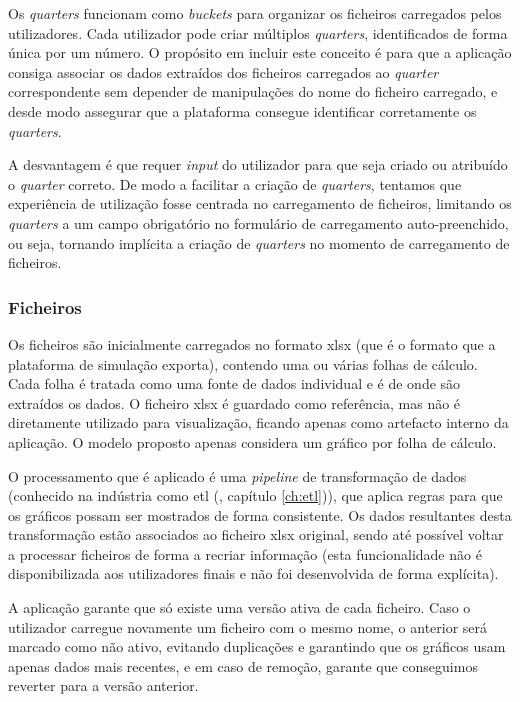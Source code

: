 Os \textit{quarters} funcionam como \textit{buckets} para organizar os ficheiros carregados pelos utilizadores. Cada utilizador pode criar múltiplos \textit{quarters}, identificados de forma única por um número. O propósito em incluir este conceito é para que a aplicação consiga associar os dados extraídos dos ficheiros carregados ao \textit{quarter} correspondente sem depender de manipulações do nome do ficheiro carregado, e desde modo assegurar que a plataforma consegue identificar corretamente os \textit{quarters}. 

A desvantagem é que requer \textit{input} do utilizador para que seja criado ou atribuído o \textit{quarter} correto. De modo a facilitar a criação de \textit{quarters}, tentamos que experiência de utilização fosse centrada no carregamento de ficheiros, limitando os \textit{quarters} a um campo obrigatório no formulário de carregamento auto-preenchido, ou seja, tornando implícita a criação de \textit{quarters} no momento de carregamento de ficheiros.

\subsubsection{Ficheiros}

Os ficheiros são inicialmente carregados no formato \gls{xlsx} (que é o formato que a plataforma de simulação exporta), contendo uma ou várias folhas de cálculo. Cada folha é tratada como uma fonte de dados individual e é de onde são extraídos os dados. O ficheiro \gls{xlsx} é guardado como referência, mas não é diretamente utilizado para visualização, ficando apenas como artefacto interno da aplicação. O modelo proposto apenas considera um gráfico por folha de cálculo.

O processamento que é aplicado é uma \textit{pipeline} de transformação de dados (conhecido na indústria como \gls{etl} (\cf, capítulo \ref{ch:etl})), que aplica regras para que os gráficos possam ser mostrados de forma consistente. Os dados resultantes desta transformação estão associados ao ficheiro \gls{xlsx} original, sendo até possível voltar a processar ficheiros de forma a recriar informação (esta funcionalidade não é disponibilizada aos utilizadores finais e não foi desenvolvida de forma explícita).

A aplicação garante que só existe uma versão ativa de cada ficheiro. Caso o utilizador carregue novamente um ficheiro com o mesmo nome, o anterior será marcado como não ativo, evitando duplicações e garantindo que os gráficos usam apenas dados mais recentes, e em caso de remoção, garante que conseguimos reverter para a versão anterior.


